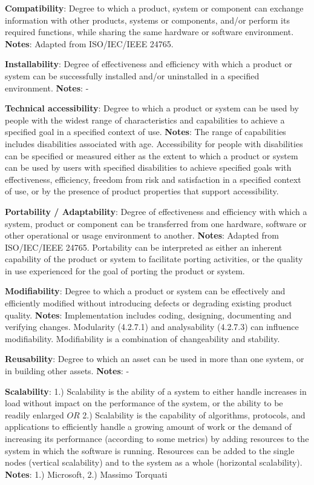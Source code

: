 \textbf{Compatibility}: Degree to which a product, system or component can exchange information with other products, systems or components, and/or perform its required functions, while sharing the same hardware or software environment. \textbf{Notes}: Adapted from ISO/IEC/IEEE 24765.

\textbf{Installability}: Degree of effectiveness and efficiency with which a product or system can be successfully installed and/or uninstalled in a specified environment. \textbf{Notes}: -

\textbf{Technical accessibility}: Degree to which a product or system can be used by people with the widest range of characteristics and capabilities to achieve a specified goal in a specified context of use. \textbf{Notes}: The range of capabilities includes disabilities associated with age. Accessibility for people with disabilities can be specified or measured either as the extent to which a product or system can be used by users with specified disabilities to achieve specified goals with effectiveness, efficiency, freedom from risk and satisfaction in a specified context of use, or by the presence of product properties that support accessibility.

\textbf{Portability / Adaptability}: Degree of effectiveness and efficiency with which a system, product or component can be transferred from one hardware, software or other operational or usage environment to another. \textbf{Notes}: Adapted from ISO/IEC/IEEE 24765. Portability can be interpreted as either an inherent capability of the product or system to facilitate porting activities, or the quality in use experienced for the goal of porting the product or system.

\textbf{Modifiability}: Degree to which a product or system can be effectively and efficiently modified without introducing defects or degrading existing product quality. \textbf{Notes}: Implementation includes coding, designing, documenting and verifying changes. Modularity (4.2.7.1) and analysability (4.2.7.3) can influence modifiability. Modifiability is a combination of changeability and stability.

\textbf{Reusability}: Degree to which an asset can be used in more than one system, or in building other assets. \textbf{Notes}: -

\textbf{Scalability}: 1.) Scalability is the ability of a system to either handle increases in load without impact on the performance of the system, or the ability to be readily enlarged $OR$ 2.) Scalability is the capability of algorithms, protocols, and applications to efficiently handle a growing amount of work or the demand of increasing its performance (according to some metrics) by adding resources to the system in which the software is running. Resources can be added to the single nodes (vertical scalability) and to the system as a whole (horizontal scalability). \textbf{Notes}: 1.) Microsoft, 2.) Massimo Torquati


